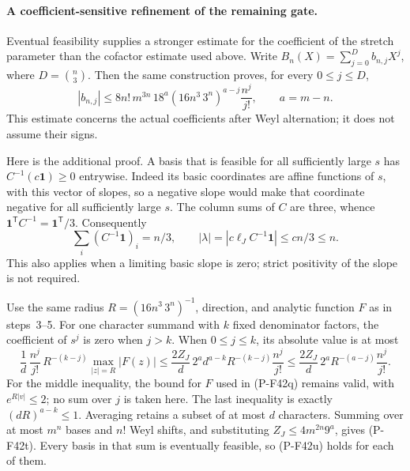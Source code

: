 \paragraph{A coefficient-sensitive refinement of the remaining gate.}
Eventual feasibility supplies a stronger estimate for the coefficient
of the stretch parameter than the cofactor estimate used above.
Write \(B_n(X)=\sum_{j=0}^{D}b_{n,j}X^j\), where
\(D=\binom n3\). Then the same construction proves, for every
\(0\le j\le D\),
\[
 |b_{n,j}|
 \le 8n!\,m^{3n}\,18^a
       (16n^3\,3^n)^{a-j}\frac{n^j}{j!},
 \qquad a=m-n.
 \tag{P-F42t}
\]
This estimate concerns the actual coefficients after Weyl
alternation; it does not assume their signs.

Here is the additional proof. A basis that is feasible for all
sufficiently large \(s\) has
\(C^{-1}(c\mathbf1)\ge0\) entrywise. Indeed its basic
coordinates are affine functions of \(s\), with this vector
of slopes, so a negative slope would make that coordinate
negative for all sufficiently large \(s\).
The column sums of \(C\) are three, whence
\(\mathbf1^{\mathsf T}C^{-1}=\mathbf1^{\mathsf T}/3\).
Consequently
\[
 \sum_i (C^{-1}\mathbf1)_i=n/3,
 \qquad
 |\lambda|=|c\ell_JC^{-1}\mathbf1|
              \le cn/3\le n.
 \tag{P-F42u}
\]
This also applies when a limiting basic slope is zero; strict
positivity of the slope is not required.

Use the same radius \(R=(16n^3\,3^n)^{-1}\), direction,
and analytic function \(F\) as in steps~3--5.
For one character summand with \(k\) fixed denominator
factors, the coefficient of \(s^j\) is zero when \(j>k\).
When \(0\le j\le k\), its absolute value is at most
\[
 \frac1d\,\frac{n^j}{j!}\,
       R^{-(k-j)}
       \max_{|z|=R}|F(z)|
 \le
 \frac{2Z_J}{d}\,2^a d^{a-k}
       R^{-(k-j)}\frac{n^j}{j!}
 \le
 \frac{2Z_J}{d}\,2^a
       R^{-(a-j)}\frac{n^j}{j!}.
 \tag{P-F42v}
\]
For the middle inequality, the bound for \(F\) used in
(P-F42q) remains valid, with \(e^{R|v|}\le2\);
no sum over \(j\) is taken here. The last inequality is
exactly \((dR)^{a-k}\le1\).
Averaging retains a subset of at most \(d\) characters.
Summing over at most \(m^n\) bases and \(n!\) Weyl
shifts, and substituting \(Z_J\le4m^{2n}9^a\), gives
(P-F42t). Every basis in that sum is eventually feasible,
so (P-F42u) holds for each of them.

